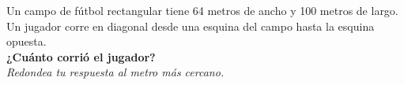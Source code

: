 \question[15]  Un campo de fútbol rectangular tiene 64 metros de ancho y 100 metros de largo.
Un jugador corre en diagonal desde una esquina del campo hasta la esquina opuesta.\\
\textbf{¿Cuánto corrió el jugador?}\\
\textit{Redondea tu respuesta al metro más cercano.}